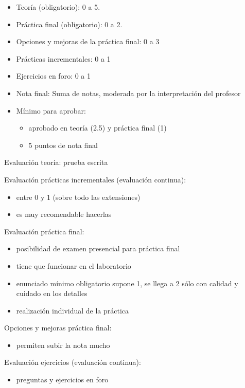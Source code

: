\documentclass[a4paper,12pt]{report}
\begin{document}
\begin{itemize}
\item Teoría (obligatorio): 0 a 5.
\item Práctica final (obligatorio): 0 a 2.
\item Opciones y mejoras de la práctica final: 0 a 3
\item Prácticas incrementales: 0 a 1
\item Ejercicios en foro: 0 a 1
\item Nota final: Suma de notas, moderada por la interpretación del profesor
\item Mínimo para aprobar:
      \begin{itemize}
      \item aprobado en teoría (2.5) y práctica final (1)
      \item 5 puntos de nota final
      \end{itemize}
\end{itemize}

Evaluación teoría: prueba escrita

Evaluación prácticas incrementales (evaluación continua):

\begin{itemize}
\item entre 0 y 1 (sobre todo las extensiones)
\item es muy recomendable hacerlas
\end{itemize}

Evaluación práctica final:

\begin{itemize}
\item posibilidad de examen presencial para práctica final
\item tiene que funcionar en el laboratorio
\item enunciado mínimo obligatorio supone 1, se llega a 2 sólo con calidad y cuidado en los detalles
\item realización individual de la práctica
\end{itemize}

Opciones y mejoras práctica final:

\begin{itemize}
\item permiten subir la nota mucho
\end{itemize}

Evaluación ejercicios (evaluación continua):

\begin{itemize}
\item preguntas y ejercicios en foro
\end{itemize}
\end{document}
